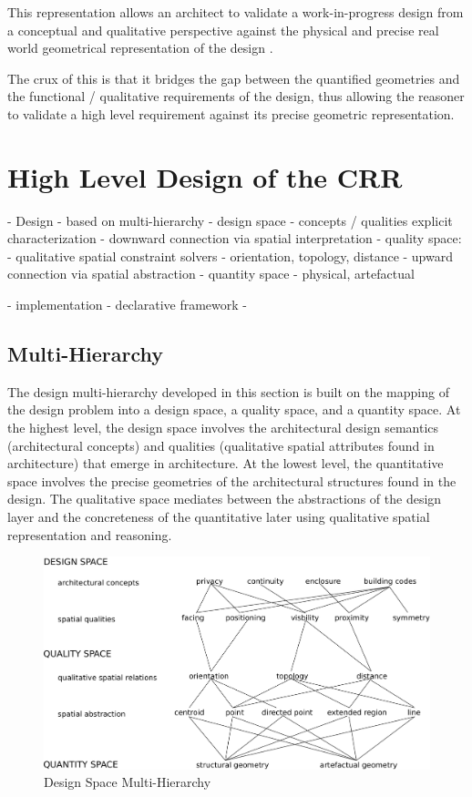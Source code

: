 \documentclass[12pt]{ucthesis}
\begin{document}
      
This representation allows an architect to validate a work-in-progress design from a conceptual and qualitative perspective against the physical and precise real world geometrical representation of the design \cite{Bhatt}.

 The crux of this is that it bridges the gap between the quantified geometries and the functional / qualitative requirements of the design, thus allowing the reasoner to validate a high level requirement against its precise geometric representation. 




\section{High Level Design of the CRR}
  - Design
      - based on multi-hierarchy
      - design space
      		- concepts / qualities explicit characterization
      		- downward connection via spatial interpretation 
      - quality space: 
       		- qualitative spatial constraint solvers
 				- orientation, topology, distance
 			- upward connection via spatial abstraction 
      - quantity space
      		- physical, artefactual
      
  - implementation
      - declarative framework
      -  

\subsection{Multi-Hierarchy}
The design multi-hierarchy developed in this section is built on the mapping of the design problem into a design space, a quality space, and a quantity space. At the highest level, the design space involves the architectural design semantics (architectural concepts) and qualities (qualitative spatial attributes found in architecture) that emerge in architecture. At the lowest level, the quantitative space involves the precise geometries of the architectural structures found in the design. The qualitative space mediates between the abstractions of the design layer and the concreteness of the quantitative later using qualitative spatial representation and reasoning.
 
\begin{figure}[H]
\centering
\includegraphics[width=140mm]{hierarchy2}
\caption{Design Space Multi-Hierarchy}
\label{hierarchy}
\end{figure}
\end{document}

